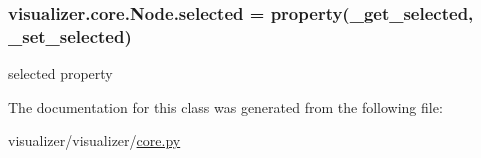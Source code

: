 \subsubsection[{\texorpdfstring{selected}{selected}}]{\setlength{\rightskip}{0pt plus 5cm}visualizer.\+core.\+Node.\+selected = property({\bf \+\_\+get\+\_\+selected}, {\bf \+\_\+set\+\_\+selected})\hspace{0.3cm}{\ttfamily [static]}}\hypertarget{classvisualizer_1_1core_1_1Node_af8f554d655e00a2cd0f25e8adaca8a02}{}\label{classvisualizer_1_1core_1_1Node_af8f554d655e00a2cd0f25e8adaca8a02}


selected property 



The documentation for this class was generated from the following file\+:\begin{DoxyCompactItemize}
\item 
visualizer/visualizer/\hyperlink{visualizer_2visualizer_2core_8py}{core.\+py}\end{DoxyCompactItemize}
